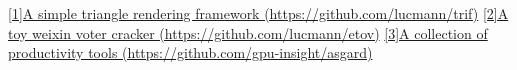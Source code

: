 
\begin{cventries}
    \cventry
    {}
    {\hypertarget{cpp-proj}{\href{https://github.com/lucmann/trif}{[1]A simple triangle rendering framework (https://github.com/lucmann/trif)}}}
    {}
    {}
    {}
    \cventry
    {}
    {\hypertarget{python-proj}{\href{https://github.com/lucmann/etov}{[2]A toy weixin voter cracker (https://github.com/lucmann/etov)}}}
    {}
    {}
    {}
    \cventry
    {}
    {\hypertarget{shell-proj}{\href{https://github.com/gpu-insight/asgard}{[3]A collection of productivity tools (https://github.com/gpu-insight/asgard)}}}
    {}
    {}
    {}
\end{cventries}
